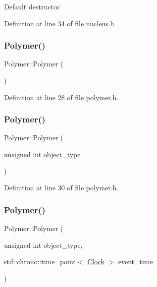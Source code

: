 Default destructor 

Definition at line 34 of file nucleus.\+h.

\mbox{\label{class_polymer_a0f7d915300bfec223c4025f8e9d4f46d}} 
\subsubsection{\texorpdfstring{Polymer()}{Polymer()}\hspace{0.1cm}{\footnotesize\ttfamily [10/14]}}
{\footnotesize\ttfamily Polymer\+::\+Polymer (\begin{DoxyParamCaption}{ }\end{DoxyParamCaption})\hspace{0.3cm}{\ttfamily [inline]}}



Definition at line 28 of file polymer.\+h.

\mbox{\label{class_polymer_adb35b8b7a5eae1e39187c0e525b0d9b1}} 
\subsubsection{\texorpdfstring{Polymer()}{Polymer()}\hspace{0.1cm}{\footnotesize\ttfamily [11/14]}}
{\footnotesize\ttfamily Polymer\+::\+Polymer (\begin{DoxyParamCaption}\item[{unsigned int}]{object\+\_\+type }\end{DoxyParamCaption})\hspace{0.3cm}{\ttfamily [inline]}}



Definition at line 30 of file polymer.\+h.

\mbox{\label{class_polymer_af918b8776cfd76d9ae4611bf35d4192a}} 
\subsubsection{\texorpdfstring{Polymer()}{Polymer()}\hspace{0.1cm}{\footnotesize\ttfamily [12/14]}}
{\footnotesize\ttfamily Polymer\+::\+Polymer (\begin{DoxyParamCaption}\item[{unsigned int}]{object\+\_\+type,  }\item[{std\+::chrono\+::time\+\_\+point$<$ \mbox{\hyperlink{universe_8h_a0ef8d951d1ca5ab3cfaf7ab4c7a6fd80}{Clock}} $>$}]{event\+\_\+time }\end{DoxyParamCaption})\hspace{0.3cm}{\ttfamily [inline]}}



